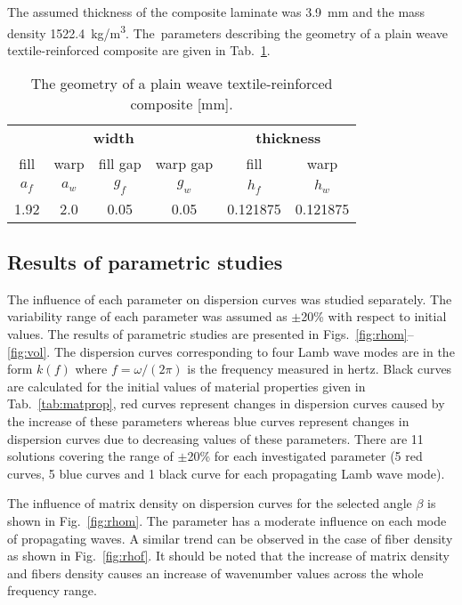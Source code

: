 \documentclass[]{spie}  %
\begin{document}
The assumed thickness of the composite laminate was 3.9~mm and the mass density 1522.4~kg/m\textsuperscript{3}. 
The~parameters describing the geometry of a plain weave textile-reinforced composite 
are given in Tab.~\ref{tab:weave_geo}. 
\begin{table}[ht]
	\renewcommand{\arraystretch}{1.3}
	\caption{The geometry of a plain weave textile-reinforced composite [mm].}
	\label{tab:weave_geo}
	\begin{center}
		\begin{tabular}{cccccc} 
			\toprule
			\multicolumn{4}{c}{\textbf{width} }	& \multicolumn{2}{c}{\textbf{thickness} }  \\ 
			\cmidrule(lr){1-4} \cmidrule(lr){5-6} 
			fill & warp & fill gap& warp gap& fill & warp\\
			\(a_f\) &\(a_w\)& \(g_f\)  & \(g_w\)  & \(h_f\)& \(h_w\) \\ 
			\cmidrule(lr){1-2} \cmidrule(lr){3-4} \cmidrule(lr){5-6}
			1.92 &2.0& 0.05& 0.05 & 0.121875 & 0.121875 \\
			\bottomrule 
		\end{tabular} 
	\end{center}
\end{table}

\cleardoublepage
\subsection{Results of parametric studies}
The influence of each parameter on dispersion curves was studied separately. 
The variability range of each parameter was assumed as \(\pm\)20\% with respect to initial values.
The results of parametric studies are presented in Figs.~\ref{fig:rhom}--\ref{fig:vol}.
The dispersion curves corresponding to four Lamb wave modes are in the form \(k(f)\) where \(f=\omega/(2 \pi)\) is the frequency measured in hertz. 
Black curves are calculated for the initial values of material properties given in Tab.~\ref{tab:matprop}, red curves represent changes in dispersion curves caused by the increase of these parameters whereas blue curves represent changes in dispersion curves due to decreasing values of these parameters. 
There are 11 solutions covering the range of \(\pm\)20\% for each investigated parameter (5 red curves, 5 blue curves and 1 black curve for each propagating Lamb wave mode).

The influence of matrix density on dispersion curves for the selected angle \(\beta\) is shown in Fig.~\ref{fig:rhom}. 
The parameter has a moderate influence on each mode of propagating waves.
A similar trend can be observed in the case of fiber density as shown in Fig.~\ref{fig:rhof}.
It should be noted that the increase of matrix density and fibers density causes an increase of wavenumber values across the whole frequency range.
\end{document}

